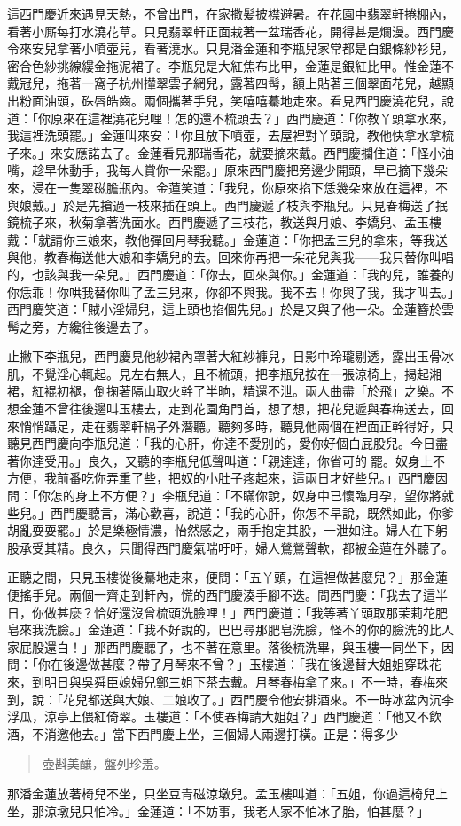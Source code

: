 這西門慶近來遇見天熱，不曾出門，在家撒髪披襟避暑。在花園中翡翠軒捲棚內，看著小廝每打水澆花草。只見翡翠軒正面栽著一盆瑞香花，開得甚是爛漫。西門慶令來安兒拿著小噴壺兒，看著澆水。只見潘金蓮和李瓶兒家常都是白銀條紗衫兒，密合色紗挑線縷金拖泥裙子。李瓶兒是大紅焦布比甲，金蓮是銀紅比甲。惟金蓮不戴冠兒，拖著一窩子杭州攆翠雲子網兒，露著四髩，額上貼著三個翠面花兒，越顯出粉面油頭，硃唇皓齒。兩個攜著手兒，笑嘻嘻驀地走來。看見西門慶澆花兒，說道：「你原來在這裡澆花兒哩！怎的還不梳頭去？」西門慶道：「你教丫頭拿水來，我這裡洗頭罷。」金蓮叫來安：「你且放下噴壺，去屋裡對丫頭說，教他快拿水拿梳子來。」來安應諾去了。金蓮看見那瑞香花，就要摘來戴。西門慶攔住道：「怪小油嘴，趁早休動手，我每人賞你一朵罷。」原來西門慶把旁邊少開頭，早已摘下幾朵來，浸在一隻翠磁膽瓶內。金蓮笑道：「我兒，你原來掐下恁幾朵來放在這裡，不與娘戴。」於是先搶過一枝來插在頭上。西門慶遞了枝與李瓶兒。只見春梅送了抿鏡梳子來，秋菊拿著洗面水。西門慶遞了三枝花，教送與月娘、李嬌兒、孟玉樓戴：「就請你三娘來，教他彈回月琴我聽。」金蓮道：「你把孟三兒的拿來，等我送與他，教春梅送他大娘和李嬌兒的去。回來你再把一朵花兒與我——我只替你叫唱的，也該與我一朵兒。」西門慶道：「你去，回來與你。」金蓮道：「我的兒，誰養的你恁乖！你哄我替你叫了孟三兒來，你卻不與我。我不去！你與了我，我才叫去。」西門慶笑道：「賊小淫婦兒，這上頭也掐個先兒。」於是又與了他一朵。金蓮簪於雲髩之旁，方纔往後邊去了。

止撇下李瓶兒，西門慶見他紗裙內罩著大紅紗褲兒，日影中玲瓏剔透，露出玉骨冰肌，不覺淫心輒起。見左右無人，且不梳頭，把李瓶兒按在一張涼椅上，揭起湘裙，紅裩初褪，倒掬著隔山取火幹了半晌，精還不泄。兩人曲盡「於飛」之樂。不想金蓮不曾往後邊叫玉樓去，走到花園角門首，想了想，把花兒遞與春梅送去，回來悄悄躡足，走在翡翠軒槅子外潛聽。聽夠多時，聽見他兩個在裡面正幹得好，只聽見西門慶向李瓶兒道：「我的心肝，你達不愛別的，愛你好個白屁股兒。今日盡著你達受用。」良久，又聽的李瓶兒低聲叫道：「親達達，你省可的𢵞罷。奴身上不方便，我前番吃你弄重了些，把奴的小肚子疼起來，這兩日才好些兒。」西門慶因問：「你怎的身上不方便？」李瓶兒道：「不瞞你說，奴身中已懷臨月孕，望你將就些兒。」西門慶聽言，滿心歡喜，說道：「我的心肝，你怎不早說，既然如此，你爹胡亂耍耍罷。」於是樂極情濃，怡然感之，兩手抱定其股，一泄如注。婦人在下躬股承受其精。良久，只聞得西門慶氣喘吁吁，婦人鶯鶯聲軟，都被金蓮在外聽了。

正聽之間，只見玉樓從後驀地走來，便問：「五丫頭，在這裡做甚麼兒？」那金蓮便搖手兒。兩個一齊走到軒內，慌的西門慶湊手腳不迭。問西門慶：「我去了這半日，你做甚麼？恰好還沒曾梳頭洗臉哩！」西門慶道：「我等著丫頭取那茉莉花肥皂來我洗臉。」金蓮道：「我不好說的，巴巴尋那肥皂洗臉，怪不的你的臉洗的比人家屁股還白！」那西門慶聽了，也不著在意里。落後梳洗畢，與玉樓一同坐下，因問：「你在後邊做甚麼？帶了月琴來不曾？」玉樓道：「我在後邊替大姐姐穿珠花來，到明日與吳舜臣媳婦兒鄭三姐下茶去戴。月琴春梅拿了來。」不一時，春梅來到，說：「花兒都送與大娘、二娘收了。」西門慶令他安排酒來。不一時冰盆內沉李浮瓜，涼亭上偎紅倚翠。玉樓道：「不使春梅請大姐姐？」西門慶道：「他又不飲酒，不消邀他去。」當下西門慶上坐，三個婦人兩邊打橫。正是：得多少——
\begin{quote}
壺斟美釀，盤列珍羞。
\end{quote}
那潘金蓮放著椅兒不坐，只坐豆青磁涼墩兒。孟玉樓叫道：「五姐，你過這椅兒上坐，那涼墩兒只怕冷。」金蓮道：「不妨事，我老人家不怕冰了胎，怕甚麼？」

